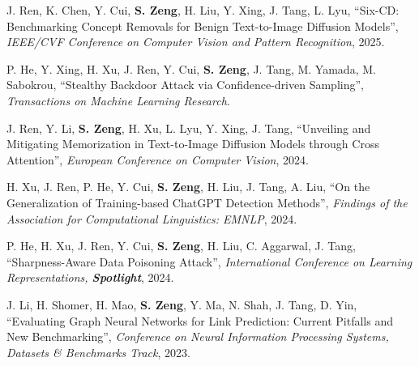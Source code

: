 \documentclass[11pt,a4paper,roman]{moderncv}        %
\newenvironment{publist}{%
  \begin{list}{}{%
    \setlength{\leftmargin}{34mm}%
    \setlength{\labelwidth}{32mm}%
    \setlength{\labelsep}{2mm}%
    \setlength{\itemsep}{1.4mm}%
    \setlength{\parsep}{0pt}%
    \setlength{\topsep}{1.5mm}%
    \renewcommand{\makelabel}[1]{\bfseries ##1\hfill}%
  }}{\end{list}}
\begin{document}
\begin{publist}
\item[{[CVPR'25]}] J. Ren, K. Chen, Y. Cui, \textbf{S. Zeng}, H. Liu, Y. Xing, J. Tang, L. Lyu, ``Six-CD: Benchmarking Concept Removals for Benign Text-to-Image Diffusion Models'', \textit{IEEE/CVF Conference on Computer Vision and Pattern Recognition}, 2025.
\item[{[TMLR]}] P. He, Y. Xing, H. Xu, J. Ren, Y. Cui, \textbf{S. Zeng}, J. Tang, M. Yamada, M. Sabokrou, ``Stealthy Backdoor Attack via Confidence-driven Sampling'', \textit{Transactions on Machine Learning Research}.
\item[{[ECCV'24]}] J. Ren, Y. Li, \textbf{S. Zeng}, H. Xu, L. Lyu, Y. Xing, J. Tang, ``Unveiling and Mitigating Memorization in Text-to-Image Diffusion Models through Cross Attention'', \textit{European Conference on Computer Vision}, 2024.
\item[{[EMNLP'24]}] H. Xu, J. Ren, P. He, Y. Cui, \textbf{S. Zeng}, H. Liu, J. Tang, A. Liu, ``On the Generalization of Training-based ChatGPT Detection Methods'', \textit{Findings of the Association for Computational Linguistics: EMNLP}, 2024.
\item[{[ICLR'24, Spotlight]}] P. He, H. Xu, J. Ren, Y. Cui, \textbf{S. Zeng}, H. Liu, C. Aggarwal, J. Tang, ``Sharpness-Aware Data Poisoning Attack'', \textit{International Conference on Learning Representations, \textbf{\color{honor}Spotlight}}, 2024.
\item[{[NeurIPS'23]}] J. Li, H. Shomer, H. Mao, \textbf{S. Zeng}, Y. Ma, N. Shah, J. Tang, D. Yin, ``Evaluating Graph Neural Networks for Link Prediction: Current Pitfalls and New Benchmarking'', \textit{Conference on Neural Information Processing Systems, Datasets \& Benchmarks Track}, 2023.
\end{publist}
\end{document}
